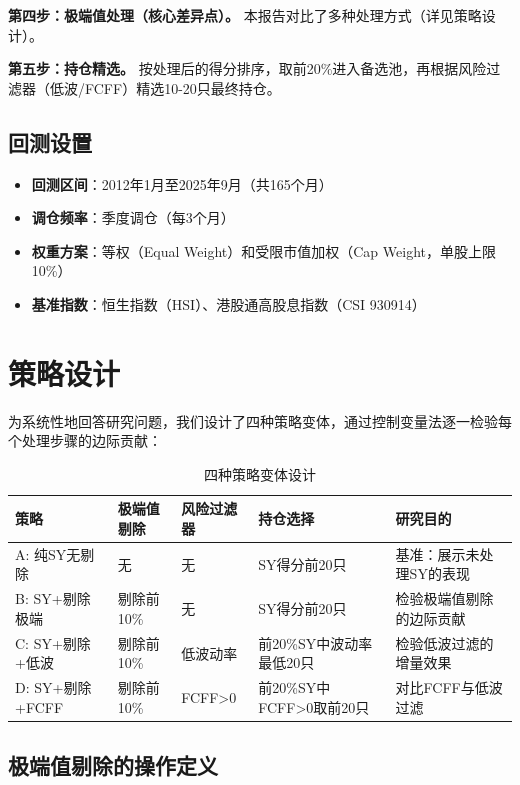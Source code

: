 \documentclass[10pt,a4paper]{ctexart}
\begin{document}
\textbf{第四步：极端值处理（核心差异点）。} 本报告对比了多种处理方式（详见策略设计）。

\textbf{第五步：持仓精选。} 按处理后的得分排序，取前20\%进入备选池，再根据风险过滤器（低波/FCFF）精选10-20只最终持仓。

\subsection{回测设置}

\begin{itemize}
    \item \textbf{回测区间}：2012年1月至2025年9月（共165个月）
    \item \textbf{调仓频率}：季度调仓（每3个月）
    \item \textbf{权重方案}：等权（Equal Weight）和受限市值加权（Cap Weight，单股上限10\%）
    \item \textbf{基准指数}：恒生指数（HSI）、港股通高股息指数（CSI 930914）
\end{itemize}

\section{策略设计}

为系统性地回答研究问题，我们设计了四种策略变体，通过控制变量法逐一检验每个处理步骤的边际贡献：

\begin{table}[htbp]
\centering
\caption{四种策略变体设计}
\begin{tabular}{lp{2.5cm}p{2.2cm}p{2.2cm}p{2.2cm}}
\toprule
\textbf{策略} & \textbf{极端值剔除} & \textbf{风险过滤器} & \textbf{持仓选择} & \textbf{研究目的} \\
\midrule
A: 纯SY无剔除 & 无 & 无 & SY得分前20只 & 基准：展示未处理SY的表现 \\
B: SY+剔除极端 & 剔除前10\% & 无 & SY得分前20只 & 检验极端值剔除的边际贡献 \\
C: SY+剔除+低波 & 剔除前10\% & 低波动率 & 前20\%SY中波动率最低20只 & 检验低波过滤的增量效果 \\
D: SY+剔除+FCFF & 剔除前10\% & FCFF>0 & 前20\%SY中FCFF>0取前20只 & 对比FCFF与低波过滤 \\
\bottomrule
\end{tabular}
\end{table}

\subsection{极端值剔除的操作定义}
\end{document}
